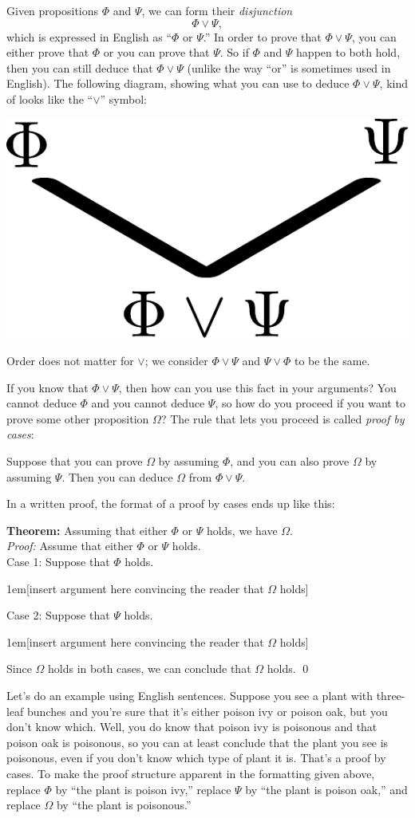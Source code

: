 \documentclass[12pt]{article}
\newcommand{\OR}{\vee}
\newcommand{\indented}[1]{\begin{adjustwidth}{1em}{}#1\end{adjustwidth}}
\newcommand{\THM}[2]{\textbf{Theorem:} #1\\[0.5em]\textit{Proof:} #2\qed}
\newcommand{\RULE}[2]{\begin{tcolorbox}[title=Rule: #1,colbacktitle=white,coltitle=black,colback=white]#2\end{tcolorbox}}
\def\pA{\Phi}
\def\pB{\Psi}
\def\pC{\Omega}
\begin{document}
Given propositions $\pA$ and $\pB$, we can form their \emph{disjunction}
$$
\pA \OR \pB,
$$
which is expressed in English as ``$\pA$ or $\pB$.''
In order to prove that $\pA\OR\pB$, you can either prove that $\pA$ or you can prove that $\pB$.
So if $\pA$ and $\pB$ happen to both hold, then you can still deduce that $\pA\OR\pB$
(unlike the way ``or'' is sometimes used in English).
The following diagram, showing what you can use to deduce $\pA\OR\pB$, kind of looks like the ``$\OR$'' symbol:
\begin{center}\includegraphics[scale=0.5]{orDiagram.pdf}\end{center}
Order does not matter for $\OR$; we consider $\pA\OR\pB$ and $\pB\OR\pA$ to be the same.

If you know that $\pA\OR\pB$, then how can you use this fact in your arguments?
You cannot deduce $\pA$ and you cannot deduce $\pB$, so how do you proceed if you want to prove some other proposition $\pC$?
The rule that lets you proceed is called \emph{proof by cases}:
\RULE{Proof by cases}{
Suppose that you can prove $\pC$ by assuming $\pA$, and you can also prove $\pC$ by assuming $\pB$.
Then you can deduce $\pC$ from $\pA\OR\pB$.
}
In a written proof, the format of a proof by cases ends up like this:

\THM{Assuming that either $\pA$ or $\pB$ holds, we have $\pC$.}{
Assume that either $\pA$ or $\pB$ holds.\\
Case 1: Suppose that $\pA$ holds.
\indented{[insert argument here convincing the reader that $\pC$ holds]}
Case 2: Suppose that $\pB$ holds.
\indented{[insert argument here convincing the reader that $\pC$ holds]}
Since $\pC$ holds in both cases, we can conclude that $\pC$ holds.
}

Let's do an example using English sentences.
Suppose you see a plant with three-leaf bunches and you're sure that it's either poison ivy or poison oak, but you don't know which.
Well, you do know that poison ivy is poisonous and that poison oak is poisonous, so you can at least conclude that the plant you see is poisonous, even
if you don't know which type of plant it is.
That's a proof by cases.
To make the proof structure apparent in
the formatting given above, replace $\pA$ by ``the plant is poison ivy,'' replace $\pB$ by ``the plant is poison oak,'' and replace $\pC$ by ``the plant is poisonous.''
\end{document}
